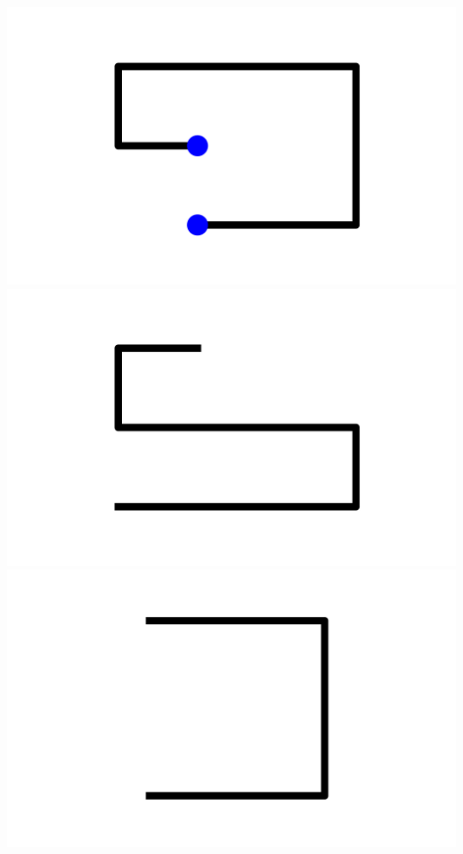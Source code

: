 \documentclass[]{report}
\begin{document}
\includegraphics[scale=.1]{pictures/18/state_cluster_shapes_13.pdf} 
\includegraphics[scale=.1]{pictures/18/state_cluster_shapes_14.pdf} 
\includegraphics[scale=.1]{pictures/18/state_cluster_shapes_15.pdf} 
\end{document}
